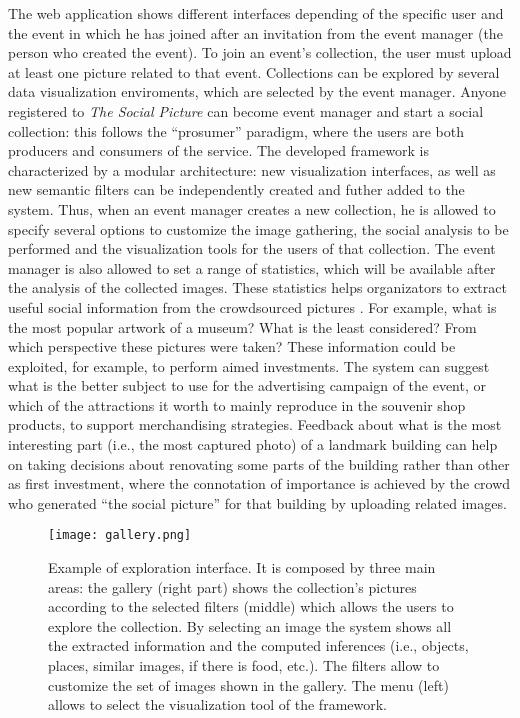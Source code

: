 The web application shows different interfaces depending of the specific user and the event in which he has joined after an invitation from the event manager (the person who created the event). To join an event's collection, the user must upload at least one picture related to that event. Collections can be explored by several data visualization enviroments, which are selected by the event manager. Anyone registered to \textit{The Social Picture} can become event manager and start a social collection: this follows the ``prosumer'' paradigm, where the users are both producers and consumers of the service.
The developed framework is characterized by a modular architecture: new visualization interfaces, as well as new semantic filters can be independently created and futher added to the system. 
Thus, when an event manager creates a new collection, he is allowed to specify several options to customize the image gathering, the social analysis to be performed and the visualization tools for the users of that collection.
The event manager is also allowed to set a range of statistics, which will be available after the analysis of the collected images. These statistics helps organizators to extract useful social information from the crowdsourced pictures \cite{Milotta2016n544}. For example, what is the most popular artwork of a museum? What is the least considered? From which perspective these pictures were taken?
These information could be exploited, for example, to perform aimed investments. The system can suggest what is the better subject to use for the advertising campaign of the event, or which of the attractions it worth to mainly reproduce in the souvenir shop products, to support merchandising strategies. Feedback about what is the most interesting part (i.e., the most captured photo) of a landmark building can help on taking decisions about renovating some parts of the building rather than other as first investment, where the connotation of importance is achieved by the crowd who generated ``the social picture'' for that building by uploading related images.


\begin{figure*}[t]
	\centering
	\texttt{[image: gallery.png]}
	\caption{Example of exploration interface. It is composed by three main areas: the gallery (right part) shows the collection's pictures according to the selected filters (middle) which allows the users to explore the collection. By selecting an image the system shows all the extracted information and the computed inferences (i.e., objects, places, similar images, if there is food, etc.). The filters allow to customize the set of images shown in the gallery. The menu (left) allows to select the visualization tool of the framework.}
	\label{interface}
\end{figure*}

